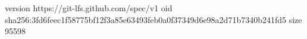 version https://git-lfs.github.com/spec/v1
oid sha256:3fd6feec1f58775bf12f3a85e63493feb0a0f37349d6e98a2d71b7340b241fd5
size 95598
